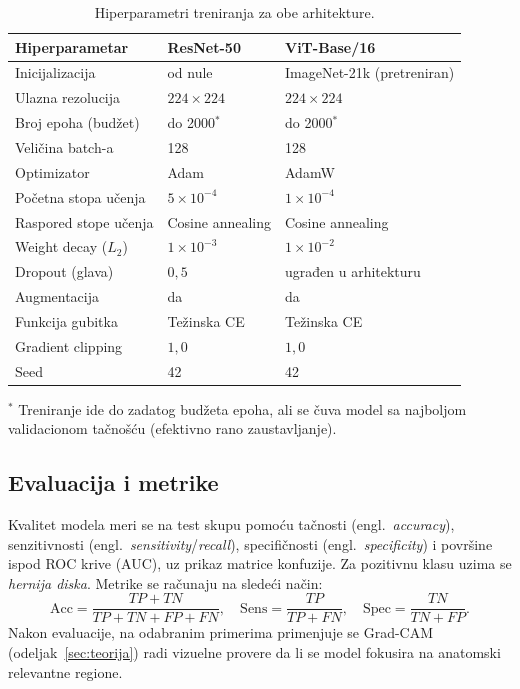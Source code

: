 \documentclass[12pt,a4paper]{article}
\begin{document}
\begin{table}[H]
\centering
\caption{Hiperparametri treniranja za obe arhitekture.}
\label{tab:hiperparametri}
\begin{tabular}{lll}
\toprule
\textbf{Hiperparametar} & \textbf{ResNet-50} & \textbf{ViT-Base/16} \\
\midrule
Inicijalizacija        & od nule                 & ImageNet-21k (pretreniran) \\
Ulazna rezolucija      & $224\times224$          & $224\times224$ \\
Broj epoha (budžet)    & do 2000$^{*}$           & do 2000$^{*}$ \\
Veličina batch-a       & 128                     & 128 \\
Optimizator            & Adam                    & AdamW \\
Početna stopa učenja   & $5\times10^{-4}$        & $1\times10^{-4}$ \\
Raspored stope učenja  & Cosine annealing        & Cosine annealing \\
Weight decay ($L_2$)   & $1\times10^{-3}$        & $1\times10^{-2}$ \\
Dropout (glava)        & $0{,}5$                 & ugrađen u arhitekturu \\
Augmentacija           & da                      & da \\
Funkcija gubitka       & Težinska CE             & Težinska CE \\
Gradient clipping      & $1{,}0$                 & $1{,}0$ \\
Seed                   & 42                      & 42 \\
\bottomrule
\end{tabular}

\vspace{2pt}
{\footnotesize $^{*}$ Treniranje ide do zadatog budžeta epoha, ali se čuva model sa
najboljom validacionom tačnošću (efektivno rano zaustavljanje).}
\end{table}

\subsection{Evaluacija i metrike}
\label{sec:metrike}

Kvalitet modela meri se na test skupu pomoću tačnosti (engl.\ \textit{accuracy}),
senzitivnosti (engl.\ \textit{sensitivity}/\textit{recall}), specifičnosti (engl.\
\textit{specificity}) i površine ispod ROC krive (AUC), uz prikaz matrice konfuzije. Za
pozitivnu klasu uzima se \textit{hernija diska}. Metrike se računaju na sledeći način:
\begin{equation}
\text{Acc}=\frac{TP+TN}{TP+TN+FP+FN},\quad
\text{Sens}=\frac{TP}{TP+FN},\quad
\text{Spec}=\frac{TN}{TN+FP}.
\label{eq:metrike}
\end{equation}
Nakon evaluacije, na odabranim primerima primenjuje se Grad-CAM
(odeljak~\ref{sec:teorija}) radi vizuelne provere da li se model fokusira na anatomski
relevantne regione.
\end{document}
